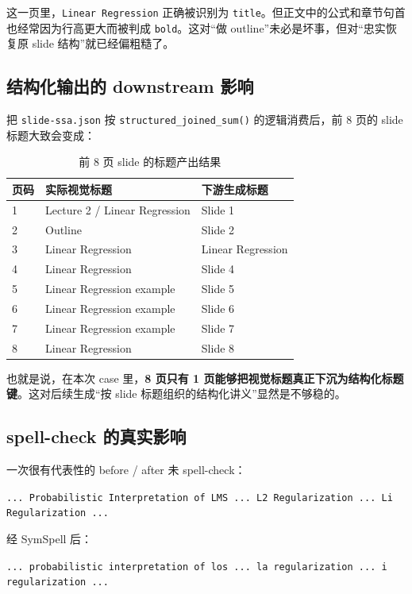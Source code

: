 \documentclass[a4paper]{article}
\begin{document}
这一页里，\texttt{Linear Regression} 正确被识别为 \texttt{title}。但正文中的公式和章节句首也经常因为行高更大而被判成 \texttt{bold}。这对“做 outline”未必是坏事，但对“忠实恢复原 slide 结构”就已经偏粗糙了。

\subsection{结构化输出的 downstream 影响}

把 \texttt{slide-ssa.json} 按 \texttt{structured\_joined\_sum()} 的逻辑消费后，前 8 页的 slide 标题大致会变成：

\begin{table}[H]
\centering
\caption{前 8 页 slide 的标题产出结果}
\begin{tabularx}{\textwidth}{p{1.4cm}p{3.1cm}Y}
\toprule
页码 & 实际视觉标题 & 下游生成标题 \\
 & Lecture 2 / Linear Regression & Slide 1 \\
2 & Outline & Slide 2 \\
3 & Linear Regression & Linear Regression \\
4 & Linear Regression & Slide 4 \\
5 & Linear Regression example & Slide 5 \\
6 & Linear Regression example & Slide 6 \\
7 & Linear Regression example & Slide 7 \\
8 & Linear Regression & Slide 8 \\
\bottomrule
\end{tabularx}
\end{table}

也就是说，在本次 case 里，\textbf{8 页只有 1 页能够把视觉标题真正下沉为结构化标题键}。这对后续生成“按 slide 标题组织的结构化讲义”显然是不够稳的。

\subsection{spell-check 的真实影响}

\begin{evidencebox}{一次很有代表性的 before / after}
未 spell-check：

\small
\texttt{... Probabilistic Interpretation of LMS ... L2 Regularization ... Li Regularization ...}
\normalsize

经 SymSpell 后：

\small
\texttt{... probabilistic interpretation of los ... la regularization ... i regularization ...}
\normalsize
\end{evidencebox}
\end{document}
